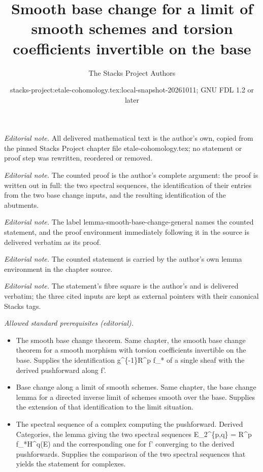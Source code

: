 \documentclass[10pt,a4paper]{amsart}
\title{Smooth base change for a limit of smooth schemes and torsion coefficients invertible on the base}
\author{The Stacks Project Authors}
\date{stacks-project:etale-cohomology.tex:local-snapshot-20261011; GNU FDL 1.2 or later}
\theoremstyle{plain}
\theoremstyle{definition}
\theoremstyle{remark}
\numberwithin{equation}{subsection}
\begin{document}
\maketitle
\noindent\textit{Editorial note.} All delivered mathematical text is the author's own, copied from the pinned Stacks Project chapter file etale-cohomology.tex; no statement or proof step was rewritten, reordered or removed.\par\medskip
\noindent\textit{Editorial note.} The counted proof is the author's complete argument: the proof is written out in full: the two spectral sequences, the identification of their entries from the two base change inputs, and the resulting identification of the abutments.\par\medskip
\noindent\textit{Editorial note.} The label lemma-smooth-base-change-general names the counted statement, and the proof environment immediately following it in the source is delivered verbatim as its proof.\par\medskip
\noindent\textit{Editorial note.} The counted statement is carried by the author's own lemma environment in the chapter source.\par\medskip
\noindent\textit{Editorial note.} The statement's fibre square is the author's and is delivered verbatim; the three cited inputs are kept as external pointers with their canonical Stacks tags.\par\medskip
\noindent\textit{Allowed standard prerequisites (editorial).}\begin{itemize}
\item The smooth base change theorem. Same chapter, the smooth base change theorem for a smooth morphism with torsion coefficients invertible on the base. Supplies the identification g\textasciicircum{}\{-1\}R\textasciicircum{}p f\_* of a single sheaf with the derived pushforward along f'.
\item Base change along a limit of smooth schemes. Same chapter, the base change lemma for a directed inverse limit of schemes smooth over the base. Supplies the extension of that identification to the limit situation.
\item The spectral sequence of a complex computing the pushforward. Derived Categories, the lemma giving the two spectral sequences E\_2\textasciicircum{}\{p,q\} = R\textasciicircum{}p f\_*H\textasciicircum{}q(E) and the corresponding one for f' converging to the derived pushforwards. Supplies the comparison of the two spectral sequences that yields the statement for complexes.
\end{itemize}\medskip
\end{document}
